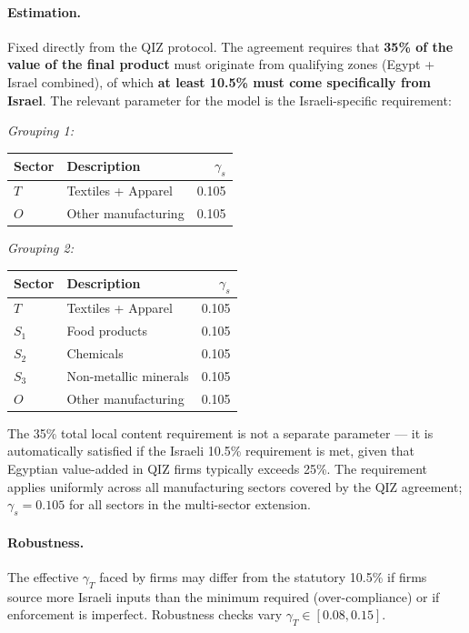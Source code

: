\documentclass[12pt]{article}
\begin{document}
\paragraph{Estimation.}
Fixed directly from the QIZ protocol. The agreement requires that
\textbf{35\% of the value of the final product} must originate from
qualifying zones (Egypt + Israel combined), of which \textbf{at least
10.5\% must come specifically from Israel}. The relevant parameter
for the model is the Israeli-specific requirement:

\noindent\textit{Grouping 1:}
\begin{center}
\begin{tabular}{llr}
\toprule
Sector & Description & $\gamma_s$ \\
\midrule
$T$ & Textiles + Apparel & 0.105 \\
$O$ & Other manufacturing & 0.105 \\
\bottomrule
\end{tabular}
\end{center}

\noindent\textit{Grouping 2:}
\begin{center}
\begin{tabular}{llr}
\toprule
Sector & Description & $\gamma_s$ \\
\midrule
$T$   & Textiles + Apparel    & 0.105 \\
$S_1$ & Food products         & 0.105 \\
$S_2$ & Chemicals             & 0.105 \\
$S_3$ & Non-metallic minerals & 0.105 \\
$O$   & Other manufacturing   & 0.105 \\
\bottomrule
\end{tabular}
\end{center}

\noindent The 35\% total local content requirement is not a separate
parameter --- it is automatically satisfied if the Israeli 10.5\%
requirement is met, given that Egyptian value-added in QIZ firms
typically exceeds 25\%. The requirement applies uniformly across all
manufacturing sectors covered by the QIZ agreement; $\gamma_s = 0.105$
for all sectors in the multi-sector extension.

\paragraph{Robustness.}
The effective $\gamma_T$ faced by firms may differ from the statutory
10.5\% if firms source more Israeli inputs than the minimum required
(over-compliance) or if enforcement is imperfect. Robustness checks
vary $\gamma_T \in [0.08, 0.15]$.
\end{document}
